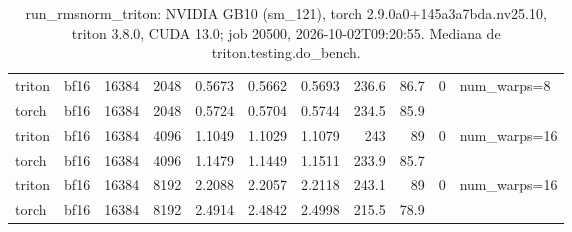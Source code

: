 \begin{table}[htbp]
\begin{tabular}{llrrrrrrrll}
    triton & bf16 & 16384 & 2048 & 0.5673 & 0.5662 & 0.5693 & 236.6 & 86.7 & 0 & num\_warps=8 \\
    torch & bf16 & 16384 & 2048 & 0.5724 & 0.5704 & 0.5744 & 234.5 & 85.9 &  &  \\
    triton & bf16 & 16384 & 4096 & 1.1049 & 1.1029 & 1.1079 & 243 & 89 & 0 & num\_warps=16 \\
    torch & bf16 & 16384 & 4096 & 1.1479 & 1.1449 & 1.1511 & 233.9 & 85.7 &  &  \\
    triton & bf16 & 16384 & 8192 & 2.2088 & 2.2057 & 2.2118 & 243.1 & 89 & 0 & num\_warps=16 \\
    torch & bf16 & 16384 & 8192 & 2.4914 & 2.4842 & 2.4998 & 215.5 & 78.9 &  &  \\
    \bottomrule
  \end{tabular}
  \caption{run\_rmsnorm\_triton: NVIDIA GB10 (sm\_121), torch 2.9.0a0+145a3a7bda.nv25.10, triton 3.8.0, CUDA 13.0; job 20500, 2026-10-02T09:20:55. Mediana de triton.testing.do\_bench.}
  \label{tab:hennessy-run-rmsnorm-triton}
\end{table}
